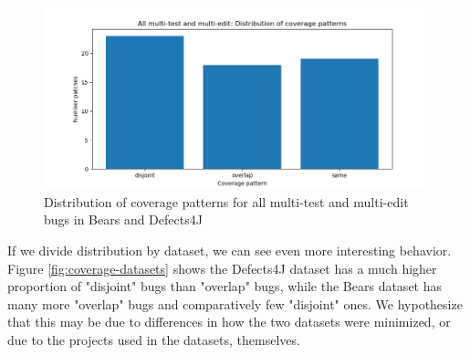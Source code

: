 \begin{figure}
	\includegraphics[width=\linewidth]{img/coverage-all.png}
	\caption{Distribution of coverage patterns for all multi-test and 
	multi-edit bugs in Bears and Defects4J}
	\label{fig:coverage-all}
\end{figure}


If we divide distribution by dataset, we can see even more interesting 
behavior. Figure \ref{fig:coverage-datasets} shows the Defects4J dataset has a 
much higher proportion of "disjoint" bugs than "overlap" bugs, while the Bears 
dataset has many more "overlap" bugs and comparatively few "disjoint" ones. We 
hypothesize that this may be due to differences in how the two datasets were 
minimized, or due to the projects used in the datasets, themselves. 


